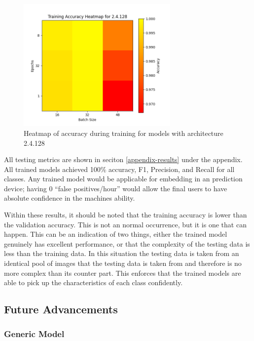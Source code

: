 \documentclass[12pt]{article}
\begin{document}
\begin{figure}[H]
\includegraphics[width=0.7\textwidth]{heatmap_training_accuracy_2.4.128}
\centering
\caption{Heatmap of accuracy during training for models with architecture 2.4.128}
\label{fig:time-metrics}
\end{figure}


All testing metrics are shown in seciton \ref{appendix-results} under the appendix. All trained models achieved 100\% accuracy, F1, Precision, and Recall for all classes. Any trained model would be applicable for embedding in an prediction device; having 0 ``false positives/hour'' would allow the final users to have absolute confidence in the machines ability. 

Within these results, it should be noted that the training accuracy is lower than the validation accuracy. This is not an normal occurrence, but it is one that can happen. This can be an indication of two things, either the trained model genuinely has excellent performance, or that the complexity of the testing data is less than the training data. In this situation the testing data is taken from an identical pool of images that the testing data is taken from and therefore is no more complex than its counter part. This enforces that the trained models are able to pick up the characteristics of each class confidently.

\subsection{Future Advancements}\label{advancements}


\subsubsection{Generic Model}
\end{document}
